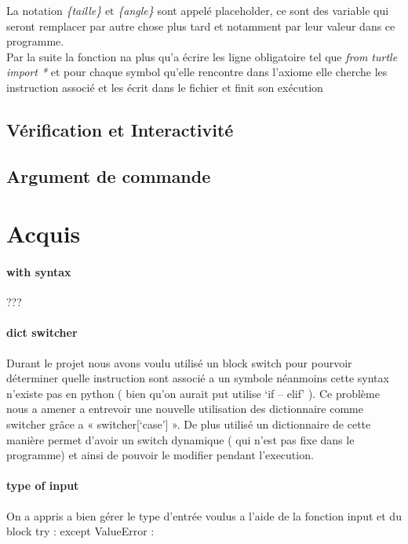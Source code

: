 \documentclass{report}
\begin{document}
			La notation \emph{\{taille\}} et \emph{\{angle\}} sont appelé placeholder, ce sont des variable qui seront remplacer par autre chose plus tard et notamment par leur valeur dans ce programme. \\
			
			Par la suite la fonction na plus qu'a écrire les ligne obligatoire tel que \emph{from turtle import *} et pour chaque symbol qu'elle rencontre dans l'axiome elle cherche les instruction associé et les écrit dans le fichier et finit son exécution
				
		\subsection{Vérification et Interactivité}
		
		\subsection{Argument de commande}
	\section{Acquis}
		\paragraph{with syntax} ???
		\paragraph{dict switcher}
			Durant le projet nous avons voulu utilisé un block switch pour pourvoir déterminer quelle instruction sont associé a un symbole néanmoins cette syntax n’existe pas en python ( bien qu’on aurait put utilise ‘if – elif’ ). Ce problème nous a amener a entrevoir une nouvelle utilisation des dictionnaire comme switcher grâce a « switcher[‘case’] ». De plus utilisé un dictionnaire de cette manière permet d’avoir un switch dynamique ( qui n’est pas fixe dans le programme) et ainsi de pouvoir le modifier pendant l’execution.
		\paragraph{type of input}
			On a appris a bien gérer le type d’entrée voulus a l’aide de la fonction input et du block try : except ValueError :
\end{document}
